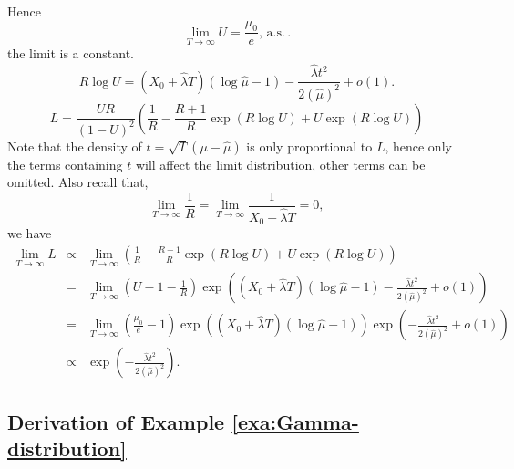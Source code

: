 \documentclass[oneside,english]{amsbook}
\numberwithin{section}{chapter}
\numberwithin{equation}{section}
\numberwithin{figure}{section}
\theoremstyle{plain}
\theoremstyle{plain}
\theoremstyle{definition}
\theoremstyle{plain}
\theoremstyle{plain}
\theoremstyle{remark}
\theoremstyle{definition}
\theoremstyle{definition}
\newcommand{\ascv}{\,\mathrm{a.s.}\,}
\begin{document}
 {Hence 
\[
\lim_{T\rightarrow\infty}U=\frac{\mu_{0}}{e},\ascv.
\]
the limit is a constant. 
\[
R\log U=\left(X_{0}+\hat{\lambda}T\right)\left(\log\hat{\mu}-1\right)-\frac{\hat{\lambda}t^{2}}{2\left(\hat{\mu}\right)^{2}}+o\left(1\right).
\]
\[
L=\frac{UR}{\left(1-U\right)^{2}}\left(\frac{1}{R}-\frac{R+1}{R}\exp\left(R\log U\right)+U\exp\left(R\log U\right)\right)
\]
Note that the density of $t=\sqrt{T}\left(\mu-\hat{\mu}\right)$ is
only proportional to $L$, hence only the terms containing $t$ will
affect the limit distribution, other terms can be omitted. Also recall
that, 
\[
\lim_{T\rightarrow\infty}\frac{1}{R}=\lim_{T\rightarrow\infty}\frac{1}{X_{0}+\hat{\lambda}T}=0,
\]
we have 
\begin{eqnarray*}
\lim_{T\rightarrow\infty}L & \propto & \lim_{T\rightarrow\infty}\left(\frac{1}{R}-\frac{R+1}{R}\exp\left(R\log U\right)+U\exp\left(R\log U\right)\right)\\
 & = & \lim_{T\rightarrow\infty}\left(U-1-\frac{1}{R}\right)\exp\left(\left(X_{0}+\hat{\lambda}T\right)\left(\log\hat{\mu}-1\right)-\frac{\hat{\lambda}t^{2}}{2\left(\hat{\mu}\right)^{2}}+o\left(1\right)\right)\\
 & = & \lim_{T\rightarrow\infty}\left(\frac{\mu_{0}}{e}-1\right)\exp\left(\left(X_{0}+\hat{\lambda}T\right)\left(\log\hat{\mu}-1\right)\right)\exp\left(-\frac{\hat{\lambda}t^{2}}{2\left(\hat{\mu}\right)^{2}}+o\left(1\right)\right)\\
 & \propto & \exp\left(-\frac{\hat{\lambda}t^{2}}{2\left(\hat{\mu}\right)^{2}}\right).
\end{eqnarray*}
}


\subsection{\label{sub:Derivation-of-Example-2}Derivation of Example \ref{exa:Gamma-distribution}}
\end{document}
